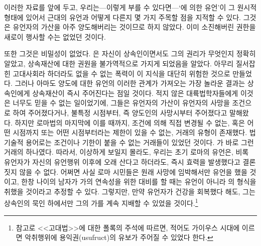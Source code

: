 이러한 자료를 앞에 두고,
%
우리는---이렇게 부를 수 있다면---`에 의한 유언'이
그 원시적 형태에 있어서 근대의 유언과 어떻게 다른지 몇 가지 주목할 점을
지적할 수 있다.
그것은 유언자의 가산을 아주 양도해버리는 것이므로
하지 않았다.
이미 소진해버린 권한을 새로이 행사할 수는 없었던 것이다.

또한 그것은 비밀성이 없었다.
은 자신이 상속인이면서도 그의 권리가 무엇인지 정확히 알았고,
상속재산에 대한 권원을 불가역적으로 가지게 되었음을 알았다.
아무리 질서잡힌 고대사회라 하더라도 없을 수 없는 폭력이 이 지식을 대단히
위험한 것으로 만들었다.
그러나 아마도 양도에 대한 유언의 이러한 관계가 가져오는 가장 놀라운 결과는
상속인에게 상속재산이 즉시 주어진다는 점일 것이다.
적지 않은 대륙법학자들에게 이것은 너무도 믿을 수 없는 일이었기에,
그들은 유언자의 가산이 유언자의 사망을 조건으로 하여 주어졌다거나,
불특정 시점부터, 즉 양도인의 사망시부터 주어졌다고 말해왔다.
하지만 로마법의 마지막에 이를 때까지,
조건에 의해 직접 변경될 수 없는, 혹은
어떤 시점까지 또는 어떤 시점부터라는 제한이 있을 수 없는,
거래의 유형이 존재했다.
법기술적 용어로는 조건이나
기한이 붙을 수 없는 거래들이 있었던 것이다.
가 바로 그런 거래의 하나였다.
따라서, 이상하게 보일지 몰라도, 우리는 초기 로마의 유언은,
비록 유언자가 자신의 유언행위 이후에 오래 산다고 하더라도,
즉시 효력을 발생했다고 결론짓지 않을 수 없다.
어쩌면 사실 로마 시민들은 원래 사망에 임박해서만 유언을 했을 것이고,
한창 나이의 남자가 가의 연속성을 위한 대비를 할 때는
유언이 아니라 의 형식을 취했을 것이라고 추정할 수 있다.
그렇지만, 만약 유언자가 건강을 회복했다 해도,
그는 상속인의 묵인 하에서만 그의 가를 계속 지배할 수 있었을 것이다.\footnote{%
  참고로 <<고대법>>에 대한 폴록의 주석에 따르면,
  적어도 가이우스 시대에 이르면
  악취행위에 용익권(usufruct)의 유보가 주어질 수 있었다 한다.
  }

